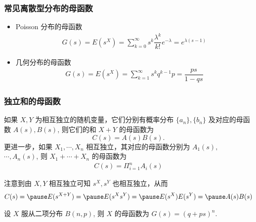 \documentclass[Prob-All.tex]{subfiles}
\begin{document}
\begin{frame}
	\frametitle{常见离散型分布的母函数}
	\begin{itemize}[<+-|alert@+>]
		\item Poisson 分布的母函数
		\begin{eqnarray*}
			G(s)=E(s^X)=\sum_{k=0}^\infty s^k\dfrac{\lambda^k}{k!}e^{-\lambda}=e^{\lambda(s-1)}
		\end{eqnarray*}
		\item 几何分布的母函数
		\begin{eqnarray*}
			G(s)=E(s^X)=\sum_{k=1}^\infty s^kq^{k-1}p=\dfrac{ps}{1-qs}
		\end{eqnarray*}

	\end{itemize}

\end{frame}

\begin{frame}
	\frametitle{独立和的母函数}
	\begin{thm}
		如果 $X,Y$ 为相互独立的随机变量，它们分别有概率分布 $\{a_n\}, \{b_n\}$ 及对应的母函数 $A (s), B (s)$, 则它们的和 $X+Y$ 的母函数为
		\[C(s)=A(s)B(s).\]
		\pause 更进一步，如果 $X_1,\cdots, X_n$ 相互独立，其对应的母函数分别为 $A_1 (s),$ $ \cdots, A_n (s)$, 则 $X_1+\cdots+X_n$ 的母函数为 \pause
		\begin{eqnarray*}
			C(s)=\Pi_{i=1}^nA_i(s)
		\end{eqnarray*}

	\end{thm}
	\pause   \zheng 注意到由 $X,Y$ 相互独立可知 $s^X, s^Y$ 也相互独立，从而 \pause
	\begin{eqnarray*}
		C(s)=\pause E(s^{X+Y})=\pause E(s^X s^Y)=\pause E(s^X)E(s^Y)=\pause A(s)B(s)
	\end{eqnarray*}

	\pause
	\begin{exam}
		设 $X$ 服从二项分布 $B (n,p)$, 则 $X$ 的母函数为 $G (s)=(q+ps)^n$.
	\end{exam}

\end{frame}
\end{document}
